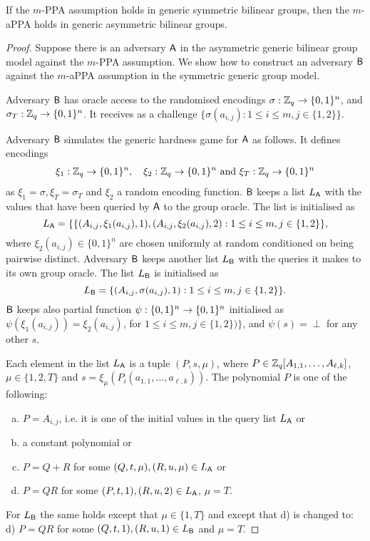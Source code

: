 \begin{theorem}
	If the $m$-PPA assumption holds in generic symmetric bilinear groups, then the $m$-aPPA holds in generic asymmetric bilinear groups.
\end{theorem}
\begin{proof}
Suppose there is an adversary $\mathsf{A}$  in the asymmetric generic bilinear group model against the $m$-PPA assumption.  We show how to construct an adversary $\mathsf{B}$ against the  $m$-aPPA assumption in the symmetric generic group model. 


Adversary $\mathsf{B}$ has oracle access to the randomised encodings $\sigma: \mathbb{Z}_q \to \{0,1\}^n$, 
and $\sigma_T: \mathbb{Z}_q \to \{0,1\}^n$. It receives as a challenge $\{ \sigma(a_{i,j}):1\leq i \leq m, j\in\{1,2\}\}$.

Adversary $\mathsf{B}$ simulates the generic hardness game for $\mathsf{A}$ as follows. It defines encodings  
\begin{align*}
	\xi_1: \mathbb{Z}_q \to \{0,1\}^n,\quad \xi_2: \mathbb{Z}_q \to \{0,1\}^n \text{ and }\xi_T: \mathbb{Z}_q \to \{0,1\}^n 
\end{align*}
as $\xi_1=\sigma, \xi_T=\sigma_T$ and $\xi_2$ a random encoding function. $\mathsf{B}$ keeps a list $L_{\mathsf{A}}$  with the values that have been queried by $\mathsf{A}$ to the group oracle. The list is initialised as 
$$L_{\mathsf{A}}=\{  \{(A_{i,j},\xi_1(a_{i,j}),1),(A_{i,j},\xi_2(a_{i,j}),2):1\leq i \leq m, j \in \{1,2\}\},$$
where $\xi_2(a_{i,j}) \in \{0,1\}^n$ are chosen uniformly at random conditioned on being pairwise distinct.  Adversary $\mathsf{B}$ keeps another list $L_{\mathsf{B}}$ with the queries 
it makes to its own group oracle. The list $L_{\mathsf{B}}$ is initialised as 
$$L_{\mathsf{B}}=\{(A_{i,j},\sigma(a_{i,j}),1):1\leq i \leq m, j \in \{1,2\}\}.$$
$\mathsf{B}$ keeps also partial function $\psi:\{0,1\}^n\to\{0,1\}^n$ initialised as
$ \psi(\xi_1(a_{i,j}))=\xi_2(a_{i,j})$, for $1\leq i\leq m,j\in\{1,2\})\}$, and $\psi(s)=\perp$ for any other $s$.

Each element in the list $L_{\mathsf{A}}$ is a tuple $(P,s,\mu)$, where $P \in \mathbb{Z}_q[A_{1,1}, \ldots,A_{\ell,k}]$, $\mu \in \{1,2,T\}$ and $s=\xi_{\mu}(P_i(a_{1,1},\ldots,a_{\ell,k}))$. The polynomial $P$ is one of the following: 
\begin{enumerate}[a)]
	\item $P=A_{i,j}$, i.e. it is one of the initial values in the query list  
$L_{\mathsf{A}}$  or 
	\item a constant polynomial or
	\item $P=Q+R$ for some $(Q,t,\mu),(R,u,\mu) \in L_{\mathsf{A}}$ or
	\item $P=QR$ for some $(P,t,1),(R,u,2) \in L_{\mathsf{A}}$, $\mu=T$.
\end{enumerate}
	For $L_{\mathsf{B}}$ the same holds except that $\mu \in \{1,T\}$ and except that d) is changed to: d) $P=QR$ for some $(Q,t,1),(R,u,1) \in L_{\mathsf{B}}$ and $\mu=T$. 


\end{proof}
